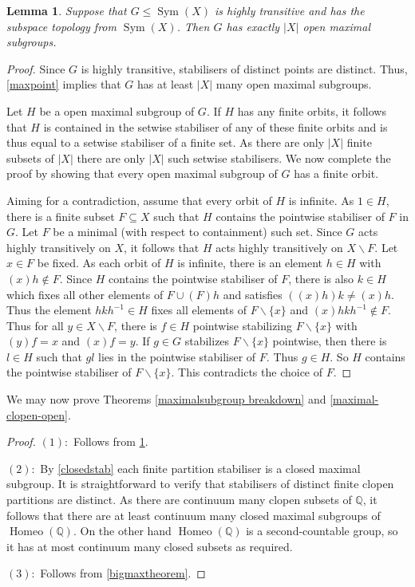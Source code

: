 \documentclass[11pt]{amsart}
\newtheorem{lemma}[theorem]{Lemma}
\theoremstyle{definition}
\newcommand{\Homeo}{\operatorname{Homeo}}
\newcommand{\Q}{\mathbb Q}
\newcommand{\Sym}{\operatorname{Sym}}
\begin{document}
\begin{lemma}\label{maxopen}
   Suppose that \(G\leq \Sym(X)\) is highly transitive and has the subspace topology from \(\Sym(X)\). Then \(G\) has exactly \(|X|\) open maximal subgroups.
\end{lemma}
\begin{proof}
      Since $G$ is highly transitive, stabilisers of distinct points are distinct. Thus, \cref{maxpoint} implies that \(G\) has at least \(|X|\) many open maximal subgroups.
    
    Let \(H\) be a open maximal subgroup of \(G\). 
If \(H\) has any finite orbits, it follows that \(H\) is contained in the setwise stabiliser of any of these finite orbits and is thus equal to a setwise stabiliser of a finite set. 
As there are only \(|X|\) finite subsets of \(|X|\) there are only \(|X|\) such setwise stabilisers.
We now complete the proof by showing that every open maximal subgroup of $G$ has a finite orbit. 

Aiming for a contradiction, assume that every orbit of \(H\) is infinite.
As \(1\in H\), there is a finite subset \(F\subseteq X\) such that \(H\) contains the pointwise stabiliser of \(F\) in $G$. Let \(F\) be a minimal (with respect to containment) such set. 
Since $G$ acts highly transitively on $X$, it follows that \(H\) acts highly transitively on \(X\backslash F\).
Let \(x\in F\) be fixed.
As each orbit of \(H\) is infinite, there is an element $h\in H$ with \((x)h\notin F\). Since \(H\) contains the pointwise stabiliser of \(F\), there is also \(k\in H\) which fixes all other elements of \(F\cup (F)h\) and satisfies \(((x)h)k\neq (x)h\). Thus the element \(hkh^{-1}\in H\) fixes all elements of \(F\backslash \{x\}\) and \((x)hkh^{-1}\notin F\).
Thus for all \(y\in X\backslash F\), there is \(f\in H\) pointwise stabilizing \(F\backslash\{x\}\) with \((y)f=x\) and \((x)f=y\).
If \(g\in G\) stabilizes \(F\backslash \{x\}\) pointwise, then there is \(l\in H\) such that \(gl\) lies in the pointwise stabiliser of \(F\). Thus \(g\in H\). So \(H\) contains the pointwise stabiliser of \(F\backslash\{x\}\). This contradicts the choice of \(F\).  
\end{proof}


We may now prove Theorems \ref{maximalsubgroup breakdown} and  \ref{maximal-clopen-open}.
\BBA*
\begin{proof}
    \((1):\) Follows from \cref{maxopen}.
    
    \((2):\) By \cref{closedstab} each finite partition stabiliser is a closed maximal subgroup. It is straightforward to verify that stabilisers of distinct finite clopen partitions are distinct. As there are continuum many clopen subsets of \(\Q\), it follows that there are at least continuum many closed maximal subgroups of \(\Homeo(\Q)\). 
  On the other hand \(\Homeo(\Q)\) is a second-countable group, so it has at most continuum many closed subsets as required.

    \((3):\) Follows from \cref{bigmaxtheorem}.
\end{proof}
\end{document}
